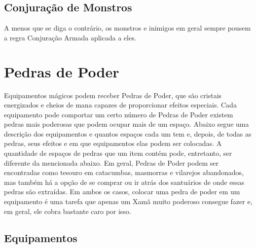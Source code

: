 \documentclass{RPG_Adventure}[2021/10/20]
\begin{document}
\begin{multicols}{2}
\subsection*{Conjuração de Monstros}%

A menos que se diga o contrário, os monstros e inimigos em geral sempre pousem a
regra Conjuração Armada aplicada a eles.

\section{Pedras de Poder}%

Equipamentos mágicos podem receber Pedras de Poder, que são cristais energizados
e cheios de mana capazes de proporcionar efeitos especiais. Cada equipamento
pode comportar um certo número de Pedras de Poder existem pedras mais poderosas
que podem ocupar mais de um espaço.
Abaixo segue uma descrição dos equipamentos e quantos espaços cada um tem e,
depois, de todas as pedras, seus efeitos e em que equipamentos elas podem ser
colocadas. A quantidade de espaços de pedras que um item contém pode,
entretanto, ser diferente da mencionada abaixo.
Em geral, Pedras de Poder podem ser encontradas como tesouro em catacumbas,
masmorras e vilarejos abandonados, mas também há a opção de se comprar ou ir
atrás dos santuários de onde essas pedras são extraídas. Em ambos os casos,
colocar uma pedra de poder em um equipamento é uma tarefa que apenas um Xamã
muito poderoso consegue fazer e, em geral, ele cobra bastante caro por isso.

\end{multicols}

\subsection*{Equipamentos}%
\end{document}
